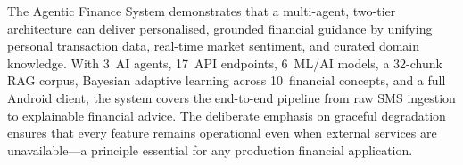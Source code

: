 \documentclass[conference]{IEEEtran}
\begin{document}
The Agentic Finance System demonstrates that a multi-agent, two-tier architecture can deliver personalised, grounded financial guidance by unifying personal transaction data, real-time market sentiment, and curated domain knowledge. With 3~AI agents, 17~API endpoints, 6~ML/AI models, a 32-chunk RAG corpus, Bayesian adaptive learning across 10~financial concepts, and a full Android client, the system covers the end-to-end pipeline from raw SMS ingestion to explainable financial advice. The deliberate emphasis on graceful degradation ensures that every feature remains operational even when external services are unavailable---a principle essential for any production financial application.
\end{document}
